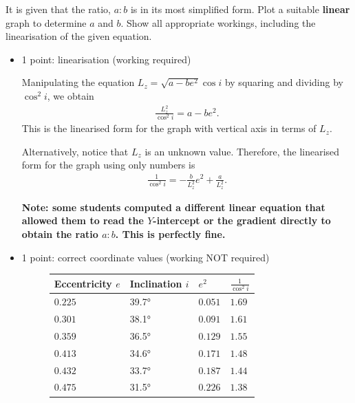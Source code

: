 \documentclass[a4paper,11pt]{exam}
\begin{document}
\begin{questions}
\filbreak
\vspace*{-30pt}
\question[6]
	It is given that the ratio, $ a : b $ is in its most simplified form. Plot a suitable \textbf{linear} graph to determine $ a $ and $ b $. Show all appropriate workings, including the linearisation of the given equation.
	\droppoints
	\begin{solution}
		\begin{itemize}
			\item 1 point: linearisation (working required)
			
			Manipulating the equation $L_z = \sqrt{a-be^2}\cos i$ by squaring and dividing by $\cos^2 i$, we obtain
			\begin{align*}
			\frac{L_z^2}{\cos^2 i} = a-be^2.
			\end{align*}
			This is the linearised form for the graph with vertical axis in terms of $L_z$.
			
			Alternatively, notice that $L_z$ is an unknown value. Therefore, the linearised form for the graph using only numbers is
			\begin{align*}
			\frac{1}{\cos^2 i} = -\frac{b}{L_z^2}e^2 + \frac{a}{L_z^2}.
			\end{align*}
			
			\textbf{Note: some students computed a different linear equation that allowed them to read the $Y$-intercept or the gradient directly to obtain the ratio $a:b$. This is perfectly fine.}
			
			\item 1 point: correct coordinate values (working NOT required)
			
			\begin{figure}[H]
				\centering
				\begin{tabularx}{0.7\textwidth}{@{}XYYY@{}}
					\toprule \textbf{Eccentricity $e$} & \textbf{Inclination $i$} & $e^2$ & $\displaystyle \frac{1}{\cos^2 i}$  \\ \midrule
					 $0.225$ & \ang{39.7} & $0.051$ & $1.69$\\
					 $0.301$ & \ang{38.1} & $0.091$ & $1.61$\\
					 $0.359$ & \ang{36.5} & $0.129$ & $1.55$\\
					 $0.413$ & \ang{34.6} & $0.171$ & $1.48$\\
					 $0.432$ & \ang{33.7} & $0.187$ & $1.44$\\
					 $0.475$ & \ang{31.5} & $0.226$ & $1.38$\\
					\bottomrule
				\end{tabularx}
			\end{figure}
			

\end{itemize}
\end{solution}
\end{questions}
\end{document}
